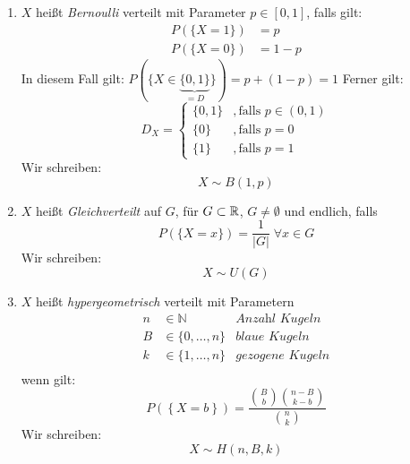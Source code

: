 \begin{enumerate}
    \item $X$ heißt \emph{Bernoulli} verteilt mit Parameter $p \in [0,1]$, falls gilt:
          \begin{align*}
              P(\{X=1\}) & = p   \\
              P(\{X=0\}) & = 1-p
          \end{align*}
          In diesem Fall gilt: $P(\{X\in\underbrace{\{0,1\}}_{=D}\}) = p+(1-p) = 1$
          Ferner gilt:
          \begin{equation*}
              D_X = \begin{cases}
                  \{0,1\} & , \text{falls } p \in (0,1) \\
                  \{0\}   & , \text{falls } p=0         \\
                  \{1\}   & , \text{falls } p=1
              \end{cases}
          \end{equation*}
          Wir schreiben:
          \begin{equation*}
              X \sim B(1,p)
          \end{equation*}

    \item $X$ heißt \emph{Gleichverteilt} auf $G$, für $G \subset \mathbb{R}$, $G \neq \emptyset$
          und endlich, falls
          \begin{equation*}
              P(\{X=x\}) = \frac{1}{|G|} \; \forall x \in G
          \end{equation*}
          Wir schreiben:
          \begin{equation*}
              X \sim U(G)
          \end{equation*}

    \item $X$ heißt \emph{hypergeometrisch} verteilt mit Parametern
          \begin{align*}
              n & \in \mathbb{N}      & \textit{Anzahl Kugeln}   \\
              B & \in \{0, \dots, n\} & \textit{blaue Kugeln}    \\
              k & \in \{1, \dots, n\} & \textit{gezogene Kugeln} \\
          \end{align*}
          wenn gilt:
          \begin{equation*}
              P\left(\left\{X=b\right\}\right)
              = \frac{\binom{B}{b} \binom{n-B}{k-b}}{\binom{n}{k}}
          \end{equation*}
          Wir schreiben:
          \begin{equation*}
              X \sim H(n,B,k)
          \end{equation*}


\end{enumerate}
